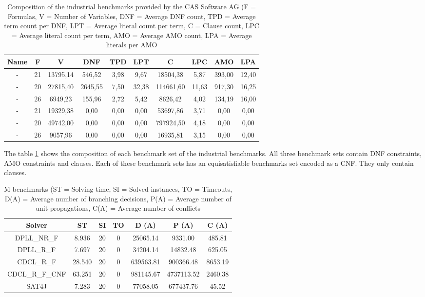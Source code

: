 \begin{table}[!htb]
\centering
\caption{Composition of the industrial benchmarks provided by the CAS Software AG (F = Formulas, V = Number of Variables, DNF = Average DNF count, TPD = Average term count per DNF, LPT = Average literal count per term, C = Clause count, LPC = Average literal count per term, AMO = Average AMO count, LPA = Average literals per AMO}
\label{tab:industrialBenchmarks}
\begin{tabular}{|c|c|c|c|c|c|c|c|c|c|}
\hline
Name & F & V & DNF & TPD & LPT & C & LPC & AMO & LPA \\ 
\hline
- & 21 & 13795,14 & 546,52 & 3,98 & 9,67 & 18504,38 & 5,87 & 393,00 & 12,40 \\ 
 \hline 
- & 20 & 27815,40 & 2645,55 & 7,50 & 32,38 & 114661,60 & 11,63 & 917,30 & 16,25 \\ 
 \hline 
- & 26 & 6949,23 & 155,96 & 2,72 & 5,42 & 8626,42 & 4,02 & 134,19 & 16,00 \\ 
 \hline 
- & 21 & 19329,38 & 0,00 & 0,00 & 0,00 & 53697,86 & 3,71 & 0,00 & 0,00 \\ 
 \hline 
- & 20 & 49742,00 & 0,00 & 0,00 & 0,00 & 797924,50 & 4,18 & 0,00 & 0,00 \\ 
 \hline 
- & 26 & 9057,96 & 0,00 & 0,00 & 0,00 & 16935,81 & 3,15 & 0,00 & 0,00 \\ 
 \hline 
\end{tabular}
\end{table}

The table \ref{tab:industrialBenchmarks} shows the composition of each benchmark set of the industrial benchmarks. All three benchmark sets contain DNF constraints, AMO constraints and clauses. Each of these benchmark sets has an equisatisfiable benchmarks set encoded as a CNF. They only contain clauses.


\begin{table}[htb]
\centering
\caption{M benchmarks (ST = Solving time, SI = Solved instances, TO = Timeouts, D(A) = Average number of branching decisions, P(A) = Average number of unit propagations, C(A) = Average number of conflicts}
\label{tab:mBenchmarks}
\begin{tabular}{|c|c|c|c|c|c|c|}
\hline
Solver & ST & SI & TO & D (A) & P (A) & C (A)\\
\hline
DPLL\_NR\_F & 8.936 & 20 & 0 & 25065.14 & 9331.00 & 485.81 \\
\hline
DPLL\_R\_F & 7.697 & 20 & 0 & 34204.14 & 14832.48 & 625.05 \\
\hline
CDCL\_R\_F & 28.540 & 20 & 0 & 639563.81 & 900366.48 & 8653.19 \\
\hline
CDCL\_R\_F\_CNF & 63.251 & 20 & 0 & 981145.67 & 4737113.52 & 2460.38 \\
\hline
SAT4J & 7.283 & 20 & 0 & 77058.05 & 677437.76 & 45.52 \\
\hline
\end{tabular}
\end{table}

